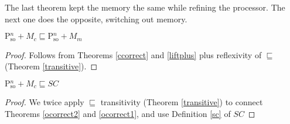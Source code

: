 The last theorem kept the memory the same while refining the
processor.  The next one does the opposite, switching out memory.

\begin{theorem}
\label{ocorrect2}
$\text{P$^n_\text{so}$} + M_c \sqsubseteq \text{P$^n_\text{so}$} + M_m$
\end{theorem}
\begin{proof}
Follows from Theorems \ref{ccorrect} and \ref{liftplus} plus reflexivity of $\sqsubseteq$ (Theorem \ref{transitive}).
\end{proof}

\begin{theorem}
\label{ofull}
$\text{P$^n_\text{so}$} + M_c \sqsubseteq SC$
\end{theorem}
\begin{proof}
We twice apply $\sqsubseteq$ transitivity (Theorem \ref{transitive}) to
connect Theorems \ref{ocorrect2} and \ref{ocorrect1}, and use Definition \ref{sc} of $SC$
\end{proof}
